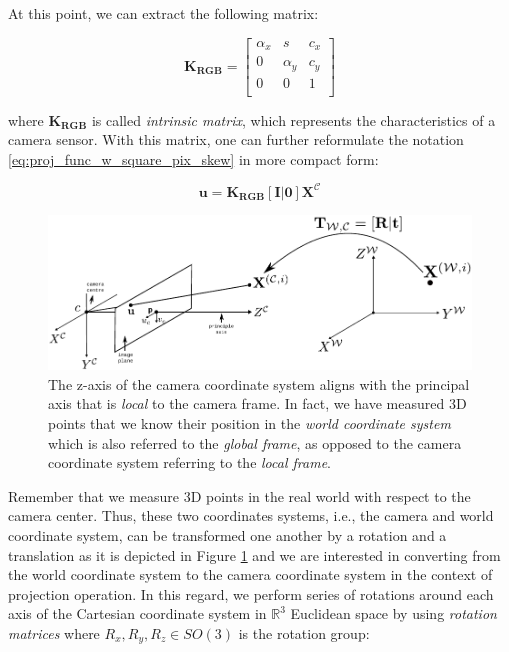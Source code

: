 \documentclass[12pt]{report}
\numberwithin{figure}{section}
\newcommand{\R}{\mathbb{R}}
\begin{document}
At this point, we can extract the following matrix:

\begin{equation}
  \mathbf{K_{RGB}} = 
  \begin{bmatrix}
    \alpha_x & s & c_x\\
    0 & \alpha_y & c_y\\
    0 & 0 & 1\\
  \end{bmatrix}\label{eq:k_matrix}
\end{equation} 

where $\mathbf{K_{RGB}}$ is called \textit{intrinsic matrix}, which represents 
the characteristics of a camera sensor.  With this matrix, one can further 
reformulate the notation \eqref{eq:proj_func_w_square_pix_skew} in more 
compact 
form:

\begin{equation}\label{eq:simplyfied_proj_func}
  \mathbf{u} = \mathbf{K_{RGB}}[\mathbf{I}|\mathbf{0}]\mathbf{X^{\mathcal{C}}}
\end{equation} 

\begin{figure}[H]
	\centering
  \includegraphics[width=\linewidth,natwidth=640,natheight=640]
  {fig/drawings/pinhole_world_to_cam.pdf}
  \caption[Extrinsic Matrix]{The z-axis of the camera coordinate system aligns 
  with the principal axis that is \textit{local} to the camera frame. In fact, 
  we 
  have measured 3D points that we know their position in the \textit{world 
  coordinate system} which is also referred to the \textit{global frame}, as 
  opposed to the camera coordinate system referring to the 
\textit{local frame}.}
  \label{fig:cam_model_rot_trans}
\end{figure}

Remember that we measure 3D points in the real world with respect to the 
camera center.  Thus, these two coordinates systems, i.e., the camera and 
world coordinate system, can be transformed one another by a rotation and a 
translation as it is depicted in Figure \ref{fig:cam_model_rot_trans} and we 
are interested in converting from the world coordinate system to the camera 
coordinate system in the context of projection operation.  In this regard, we 
perform series of rotations around each axis of the Cartesian coordinate 
system in $\R^3$ Euclidean space by using \textit{rotation matrices} where 
$R_x, R_y, R_z \in SO(3)$ is the rotation group:
\end{document}
